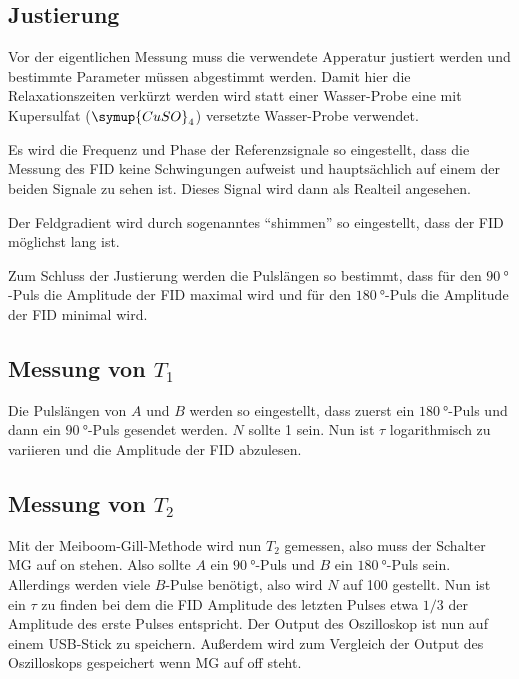 \subsection{Justierung}
\label{ssec:Justierung}

Vor der eigentlichen Messung muss die verwendete Apperatur justiert werden und bestimmte Parameter müssen abgestimmt werden.
Damit hier die Relaxationszeiten verkürzt werden wird statt einer Wasser-Probe
eine mit Kupersulfat ($\symup{CuSO}_4$) versetzte Wasser-Probe verwendet.

Es wird die Frequenz und Phase der Referenzsignale so eingestellt, 
dass die Messung des FID keine Schwingungen aufweist und hauptsächlich auf einem der beiden Signale zu sehen ist.
Dieses Signal wird dann als Realteil angesehen.

Der Feldgradient wird durch sogenanntes \enquote{shimmen} so eingestellt, dass der FID möglichst lang ist.

Zum Schluss der Justierung werden die Pulslängen so bestimmt, 
dass für den $\SI{90}{\degree}$-Puls die Amplitude der FID maximal wird
und für den $\SI{180}{\degree}$-Puls die Amplitude der FID minimal wird.

\subsection{Messung von \texorpdfstring{$T_1$}{T1}}
\label{ssec:T1_messung}

Die Pulslängen von $A$ und $B$ werden so eingestellt, dass zuerst ein $\SI{180}{\degree}$-Puls und dann ein $\SI{90}{\degree}$-Puls gesendet werden.
$N$ sollte 1 sein.
Nun ist $\tau$ logarithmisch zu variieren und die Amplitude der FID abzulesen.

\subsection{Messung von \texorpdfstring{$T_2$}{T2}}
\label{ssec:T2_messung}

Mit der Meiboom-Gill-Methode wird nun $T_2$ gemessen, also muss der Schalter MG auf on stehen.
Also sollte $A$ ein $\SI{90}{\degree}$-Puls und $B$ ein $\SI{180}{\degree}$-Puls sein.
Allerdings werden viele $B$-Pulse benötigt, also wird $N$ auf 100 gestellt.
Nun ist ein $\tau$ zu finden bei dem die FID Amplitude des letzten Pulses etwa $1/3$ der Amplitude des erste Pulses entspricht.
Der Output des Oszilloskop ist nun auf einem USB-Stick zu speichern.
Außerdem wird zum Vergleich der Output des Oszilloskops gespeichert wenn MG auf off steht.

